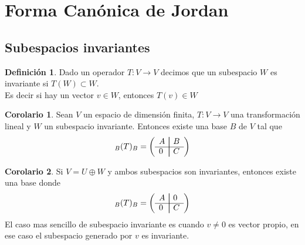 \documentclass[10pt]{article}
\theoremstyle{definition}
\newtheorem{definition}{Definición}[section]
\newtheorem{corollary}{Corolario}[theorem]
\begin{document}
\section{Forma Canónica de Jordan}
\subsection{Subespacios invariantes}
\begin{definition}
	Dado un operador $T:V\to V$ decimos que un subespacio $W$ es invariante si $T(W)\subset W$.\\
	Es decir si hay un vector $v\in W$, entonces $T(v)\in W$
\end{definition}
\begin{corollary}
	Sean $V$ un espacio de dimensión finita, $T:V\to V$ una transformación lineal y $W$ un subespacio invariante. Entonces existe una base $B$ de $V$ tal que
	$$_B(T)_B=\left( \begin{array}{ll}
			\multicolumn{1}{l|}{A} & \multicolumn{1}{|l}{B} \\ \cline{1-2}
			\multicolumn{1}{l|}{0} & \multicolumn{1}{|l}{C}
		\end{array} \right) $$
\end{corollary}
\begin{corollary}
	Si $V=U\oplus W$ y ambos subespacios son invariantes, entonces existe una base donde
	$$
		_B(T)_B=\left( \begin{array}{ll}
			\multicolumn{1}{l|}{A} & \multicolumn{1}{|l}{0} \\ \cline{1-2}
			\multicolumn{1}{l|}{0} & \multicolumn{1}{|l}{C}
		\end{array} \right)
	$$
	El caso mas sencillo de subespacio invariante es cuando $v\neq 0$ es vector propio, en ese caso el subespacio generado por $v$ es invariante.
\end{corollary}
\end{document}
